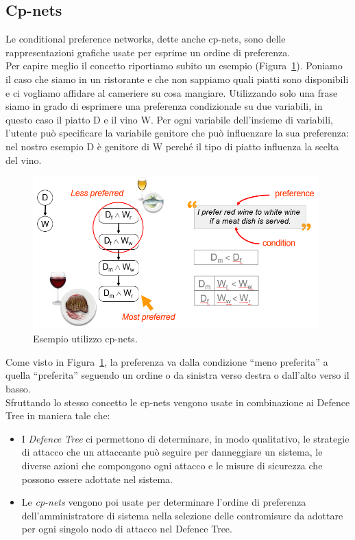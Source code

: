 \subsection{Cp-nets}
Le conditional preference networks, dette anche cp-nets, sono delle rappresentazioni grafiche usate per esprime un ordine di preferenza.\\ 

Per capire meglio il concetto riportiamo subito un esempio (Figura~\ref{fig:cp-nets_example}). Poniamo il caso che siamo in un ristorante e che non sappiamo quali piatti sono disponibili e ci vogliamo affidare al cameriere su cosa mangiare. Utilizzando solo una frase siamo in grado di esprimere una preferenza condizionale su due variabili, in questo caso il piatto D e il vino W. Per ogni variabile dell'insieme di variabili, l'utente può specificare la variabile genitore che può influenzare la sua preferenza: nel nostro esempio D è genitore di W perché il tipo di piatto influenza la scelta del vino.

\begin{figure}[H]
	\centering
	\includegraphics[width=11cm, keepaspectratio]{capitoli/risks/imgs/cp-nets_example.png}
	\caption{Esempio utilizzo cp-nets.}
	\label{fig:cp-nets_example}
\end{figure}

Come visto in Figura~\ref{fig:cp-nets_example}, la preferenza va dalla condizione ``meno preferita'' a quella ``preferita'' seguendo un ordine o da sinistra verso destra o dall'alto verso il basso.\\

Sfruttando lo stesso concetto le cp-nets vengono usate in combinazione ai Defence Tree in maniera tale che:
\begin{itemize}
	\item I \emph{Defence Tree} ci permettono di determinare, in modo qualitativo, le strategie di attacco che un attaccante può seguire per danneggiare 
	un sistema, le diverse azioni che compongono ogni attacco e le misure di sicurezza che possono essere adottate nel sistema.
	\item Le \emph{cp-nets} vengono poi usate per determinare l'ordine di preferenza dell'amministratore di sistema nella selezione delle contromisure da adottare per ogni singolo nodo di attacco nel Defence Tree.
\end{itemize}

